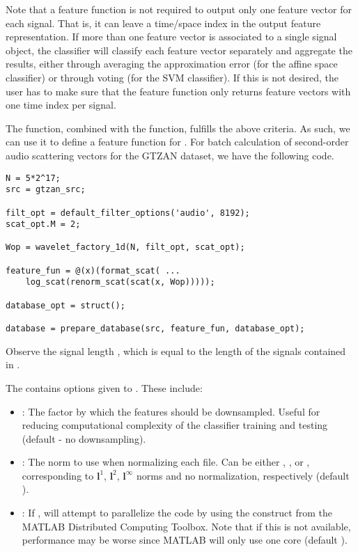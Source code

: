 \documentclass{article}
\begin{document}
Note that a feature function is not required to output only one feature vector for each signal. That is, it can leave a time/space index in the output feature representation. If more than one feature vector is associated to a single signal object, the classifier will classify each feature vector separately and aggregate the results, either through averaging the approximation error (for the affine space classifier) or through voting (for the SVM classifier). If this is not desired, the user has to make sure that the feature function only returns feature vectors with one time index per signal.

The  function, combined with the  function, fulfills the above criteria. As such, we can use it to define a feature function for . For batch calculation of second-order audio scattering vectors for the GTZAN dataset, we have the following code.
\begin{lstlisting}
N = 5*2^17;
src = gtzan_src;

filt_opt = default_filter_options('audio', 8192);
scat_opt.M = 2;

Wop = wavelet_factory_1d(N, filt_opt, scat_opt);

feature_fun = @(x)(format_scat( ...
	log_scat(renorm_scat(scat(x, Wop)))));
	
database_opt = struct();
	
database = prepare_database(src, feature_fun, database_opt);
\end{lstlisting}
Observe the signal length , which is equal to the length of the signals contained in . 

The  contains options given to . These include:
\begin{itemize}
	\item {}: The factor by which the features should be downsampled. Useful for reducing computational complexity of the classifier training and testing (default  - no downsampling).
	\item {}: The norm to use when normalizing each file. Can be either , ,  or \mcode{[]}, corresponding to $\mathbf{l}^1$, $\mathbf{l}^2$, $\mathbf{l}^\infty$ norms and no normalization, respectively (default \mcode{[]}).
	\item {}: If ,  will attempt to parallelize the code by using the  construct from the MATLAB Distributed Computing Toolbox. Note that if this is not available, performance may be worse since MATLAB will only use one core (default ).
\end{itemize}
\end{document}

